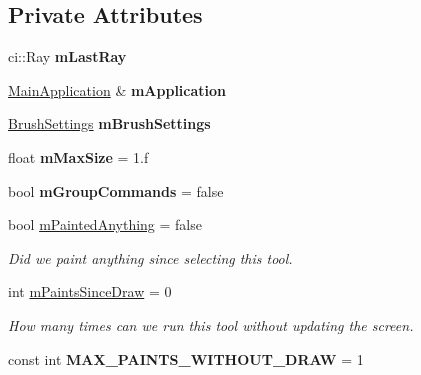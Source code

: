 \subsection*{Private Attributes}
\begin{DoxyCompactItemize}
\item 
\mbox{\label{classpepr3d_1_1_brush_a14e8b45a6cab895de81f98d316764fd8}} 
ci\+::\+Ray {\bfseries m\+Last\+Ray}
\item 
\mbox{\label{classpepr3d_1_1_brush_aa3ae79e358a25a2b2c0991bb279867fa}} 
\mbox{\hyperlink{classpepr3d_1_1_main_application}{Main\+Application}} \& {\bfseries m\+Application}
\item 
\mbox{\label{classpepr3d_1_1_brush_a3128cd83946b4f78252d85a782b9930c}} 
\mbox{\hyperlink{structpepr3d_1_1_brush_settings}{Brush\+Settings}} {\bfseries m\+Brush\+Settings}
\item 
\mbox{\label{classpepr3d_1_1_brush_ac4988a483a10b304b2334d40cf3c6439}} 
float {\bfseries m\+Max\+Size} = 1.f
\item 
\mbox{\label{classpepr3d_1_1_brush_a04835f1e155d63adc659650cf372a6aa}} 
bool {\bfseries m\+Group\+Commands} = false
\item 
\mbox{\label{classpepr3d_1_1_brush_a3b228cb4c9e5e7bf60904ab74e2fc6df}} 
bool \mbox{\hyperlink{classpepr3d_1_1_brush_a3b228cb4c9e5e7bf60904ab74e2fc6df}{m\+Painted\+Anything}} = false
\begin{DoxyCompactList}\small\item\em Did we paint anything since selecting this tool. \end{DoxyCompactList}\item 
\mbox{\label{classpepr3d_1_1_brush_a0d333fbd43343ebb6d2cafa60d7220f0}} 
int \mbox{\hyperlink{classpepr3d_1_1_brush_a0d333fbd43343ebb6d2cafa60d7220f0}{m\+Paints\+Since\+Draw}} = 0
\begin{DoxyCompactList}\small\item\em How many times can we run this tool without updating the screen. \end{DoxyCompactList}\item 
\mbox{\label{classpepr3d_1_1_brush_a5df405cb3c238fac2e0b036a52ca59e7}} 
const int {\bfseries M\+A\+X\+\_\+\+P\+A\+I\+N\+T\+S\+\_\+\+W\+I\+T\+H\+O\+U\+T\+\_\+\+D\+R\+AW} = 1
\end{DoxyCompactItemize}
